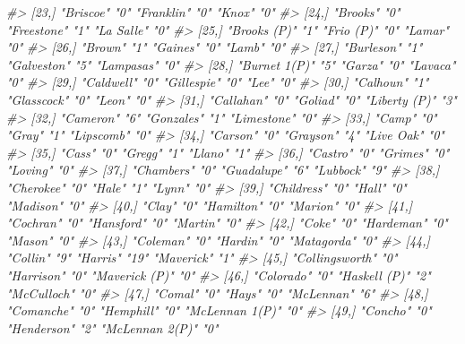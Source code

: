 \documentclass[
]{krantz}
\makeatletter
\newenvironment{Shaded}{\begin{snugshade}}{\end{snugshade}}
\newcommand{\CommentTok}[1]{\textcolor[rgb]{0.37,0.37,0.37}{\textit{#1}}}
\newenvironment{kframe}{%
\medskip{}
\setlength{\fboxsep}{.8em}
 \def\at@end@of@kframe{}%
 \ifinner\ifhmode%
  \def\at@end@of@kframe{\end{minipage}}%
  \begin{minipage}{\columnwidth}%
 \fi\fi%
 \def\FrameCommand##1{\hskip\@totalleftmargin \hskip-\fboxsep
 \colorbox{shadecolor}{##1}\hskip-\fboxsep
     \hskip-\linewidth \hskip-\@totalleftmargin \hskip\columnwidth}%
 \MakeFramed {\advance\hsize-\width
   \@totalleftmargin\z@ \linewidth\hsize
   \@setminipage}}%
 {\par\unskip\endMakeFramed%
 \at@end@of@kframe}
\renewenvironment{Shaded}{\begin{kframe}}{\end{kframe}}
\makeatother
\begin{document}
\begin{Shaded}
\begin{Highlighting}[]
\CommentTok{\#\textgreater{} [23,] "Briscoe"       "0"  "Franklin"    "0"  "Knox"          "0" }
\CommentTok{\#\textgreater{} [24,] "Brooks"        "0"  "Freestone"   "1"  "La Salle"      "0" }
\CommentTok{\#\textgreater{} [25,] "Brooks (P)"    "1"  "Frio (P)"    "0"  "Lamar"         "0" }
\CommentTok{\#\textgreater{} [26,] "Brown"         "1"  "Gaines"      "0"  "Lamb"          "0" }
\CommentTok{\#\textgreater{} [27,] "Burleson"      "1"  "Galveston"   "5"  "Lampasas"      "0" }
\CommentTok{\#\textgreater{} [28,] "Burnet 1(P)"   "5"  "Garza"       "0"  "Lavaca"        "0" }
\CommentTok{\#\textgreater{} [29,] "Caldwell"      "0"  "Gillespie"   "0"  "Lee"           "0" }
\CommentTok{\#\textgreater{} [30,] "Calhoun"       "1"  "Glasscock"   "0"  "Leon"          "0" }
\CommentTok{\#\textgreater{} [31,] "Callahan"      "0"  "Goliad"      "0"  "Liberty (P)"   "3" }
\CommentTok{\#\textgreater{} [32,] "Cameron"       "6"  "Gonzales"    "1"  "Limestone"     "0" }
\CommentTok{\#\textgreater{} [33,] "Camp"          "0"  "Gray"        "1"  "Lipscomb"      "0" }
\CommentTok{\#\textgreater{} [34,] "Carson"        "0"  "Grayson"     "4"  "Live Oak"      "0" }
\CommentTok{\#\textgreater{} [35,] "Cass"          "0"  "Gregg"       "1"  "Llano"         "1" }
\CommentTok{\#\textgreater{} [36,] "Castro"        "0"  "Grimes"      "0"  "Loving"        "0" }
\CommentTok{\#\textgreater{} [37,] "Chambers"      "0"  "Guadalupe"   "6"  "Lubbock"       "9" }
\CommentTok{\#\textgreater{} [38,] "Cherokee"      "0"  "Hale"        "1"  "Lynn"          "0" }
\CommentTok{\#\textgreater{} [39,] "Childress"     "0"  "Hall"        "0"  "Madison"       "0" }
\CommentTok{\#\textgreater{} [40,] "Clay"          "0"  "Hamilton"    "0"  "Marion"        "0" }
\CommentTok{\#\textgreater{} [41,] "Cochran"       "0"  "Hansford"    "0"  "Martin"        "0" }
\CommentTok{\#\textgreater{} [42,] "Coke"          "0"  "Hardeman"    "0"  "Mason"         "0" }
\CommentTok{\#\textgreater{} [43,] "Coleman"       "0"  "Hardin"      "0"  "Matagorda"     "0" }
\CommentTok{\#\textgreater{} [44,] "Collin"        "9"  "Harris"      "19" "Maverick"      "1" }
\CommentTok{\#\textgreater{} [45,] "Collingsworth" "0"  "Harrison"    "0"  "Maverick (P)"  "0" }
\CommentTok{\#\textgreater{} [46,] "Colorado"      "0"  "Haskell (P)" "2"  "McCulloch"     "0" }
\CommentTok{\#\textgreater{} [47,] "Comal"         "0"  "Hays"        "0"  "McLennan"      "6" }
\CommentTok{\#\textgreater{} [48,] "Comanche"      "0"  "Hemphill"    "0"  "McLennan 1(P)" "0" }
\CommentTok{\#\textgreater{} [49,] "Concho"        "0"  "Henderson"   "2"  "McLennan 2(P)" "0" }

\end{Highlighting}
\end{Shaded}
\end{document}
